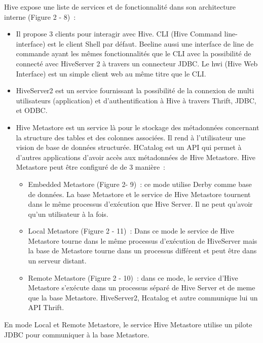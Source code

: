 \documentclass[12pt,english]{book}
\begin{document}

Hive expose une liste de services et de fonctionnalité dans son architecture interne (Figure 2 - 8) :

\begin{itemize}
\item
Il propose 3 clients pour interagir avec Hive.  CLI (Hive Command line-interface) est le client Shell par défaut.  Beeline aussi une interface de line de commande ayant les mêmes fonctionnalités que le CLI avec la possibilité de connecté avec HiveServer 2 à travers un connecteur JDBC.  Le hwi (Hive Web Interface) est un simple client web au même titre que le CLI. 
\item
HiveServer2 est un service fournissant la possibilité de la connexion de multi utilisateurs (application) et d’authentification à Hive à travers Thrift, JDBC, et ODBC. 
\item
Hive Metastore est un service là pour le stockage des métadonnées concernant la structure des tables et des colonnes associées. Il rend à l’utilisateur une vision de base de données structurée. HCatalog est un API qui permet à d’autres applications d’avoir accès aux métadonnées de Hive Metastore. Hive Metastore peut être configuré de de 3 manière : 
	\begin{itemize}
	\item
	Embedded Metastore (Figure 2- 9) : ce mode utilise Derby comme base de données. La base Metastore et le service de Hive Metastore tournent dans le même processus d’exécution que Hive Server. Il ne peut qu’avoir qu’un utilisateur à la fois.
	\item
	Local Metastore (Figure 2 - 11) : Dans ce mode le service de Hive Metastore tourne dans le même processus d’exécution de HiveServer mais la base de Metastore tourne dans un processus différent et peut être dans un serveur distant.
	\item
	Remote Metastore (Figure 2 - 10) : dans ce mode, le service d’Hive Metastore s’exécute dans un processus séparé de Hive Server et de meme que la base Metastore. HiveServer2, Hcatalog et autre communique lui un API Thrift.
	\end{itemize}
\end{itemize}

En mode Local et Remote Metastore, le service Hive Metastore utilise un pilote JDBC pour communiquer à la base Metastore. 
\end{document}
